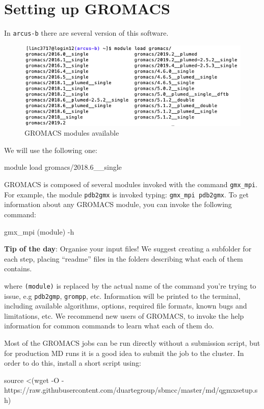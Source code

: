 \documentclass[10pt]{article}
\begin{document}
\section{Setting up GROMACS}
In \texttt{arcus-b} there are several version of this software. \begin{figure}[H]
 \centering
 \includegraphics[scale=0.5]{./img/gromacs}
 \caption{GROMACS modules available}
\end{figure}
We will use the following one:
\begin{cmdline}
module load gromacs/2018.6__single
\end{cmdline}

GROMACS is composed of several modules invoked with the command \texttt{gmx\_mpi}. For example, the module \texttt{pdb2gmx} is invoked typing: \texttt{gmx\_mpi pdb2gmx}. To get information about any GROMACS module, you can invoke the following command:
\begin{cmdline}
gmx_mpi (module) -h
\end{cmdline}
\textbf{Tip of the day}: Organise your input files! We suggest creating a subfolder for each step, placing ``readme'' files in the folders describing what each of them contains.

where \texttt{(module)} is replaced by the actual name of the command you're trying to issue, e.g \texttt{pdb2gmp}, \texttt{grompp}, etc. Information will be printed to the terminal, including available algorithms, options, required file formats, known bugs and limitations, etc. We recommend new users of GROMACS, to invoke the help information for common commands to learn what each of them do. 

Most of the GROMACS jobs can be run directly without a submission script, but for production MD runs it is a good idea to submit the job to the cluster. In order to do this, install a short script using:

\begin{cmdline}
source <(wget -O - https://raw.githubusercontent.com/duartegroup/sbmcc/master/md/qgmxsetup.sh)
\end{cmdline}
\end{document}
